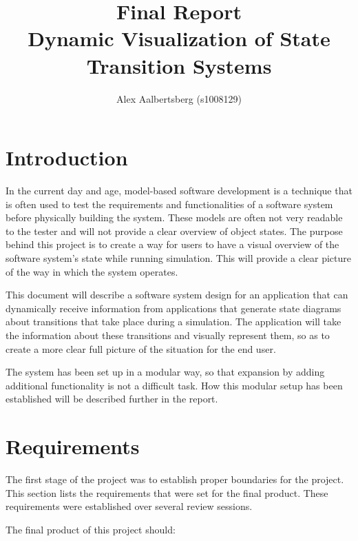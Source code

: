 \documentclass[11pt,a4paper]{article}
\begin{document}
\title{Final Report \\ \vspace{2mm} {\large Dynamic Visualization of State Transition Systems}}
\author{Alex Aalbertsberg (s1008129)}
\maketitle

\clearpage
\tableofcontents

\clearpage
\section{Introduction}

In the current day and age, model-based software development is a technique that is often used to test the requirements and functionalities of a software system before physically building the system. These models are often not very readable to the tester and will not provide a clear overview of object states. The purpose behind this project is to create a way for users to have a visual overview of the software system's state while running simulation. This will provide a clear picture of the way in which the system operates.

This document will describe a software system design for an application that can dynamically receive information from applications that generate state diagrams about transitions that take place during a simulation. The application will take the information about these transitions and visually represent them, so as to create a more clear full picture of the situation for the end user.

The system has been set up in a modular way, so that expansion by adding additional functionality is not a difficult task. How this modular setup has been established will be described further in the report.

\section{Requirements}

The first stage of the project was to establish proper boundaries for the project. This section lists the requirements that were set for the final product. These requirements were established over several review sessions.	

The final product of this project should:
\end{document}
